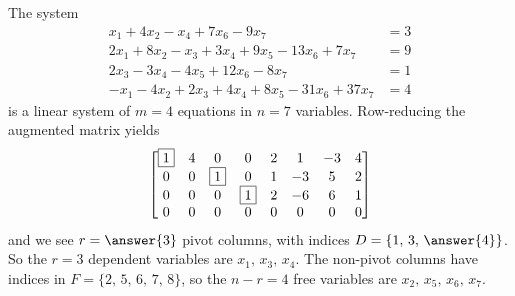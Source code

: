 \documentclass{ximera}
\begin{document}
\begin{example}
  The system
  \begin{align*}
    x_1 +4x_2  - x_4  + 7x_6 - 9x_7 &= 3\\
    2x_1 + 8x_2 - x_3 + 3x_4 + 9x_5 - 13x_6 + 7x_7 &= 9\\
    2x_3 -3x_4 -4x_5 +12x_6 -8x_7 &= 1\\
    -x_1  - 4x_2 + 2x_3 +4x_4 + 8x_5 - 31x_6 + 37x_7 &= 4
  \end{align*}
  is a linear system of $m=4$ equations in $n=7$ variables.
  Row-reducing the augmented matrix yields
  \[\begin{bmatrix}
      \fbox{1} & 4 & 0 & 0 & 2 & 1 & -3 & 4 \\
      0 & 0 & \fbox{1}  &  0 & 1 &  -3 & 5 & 2 \\
      0 & 0 &  0 & \fbox{1} & 2 &  -6 & 6 & 1 \\
      0 & 0 &  0 & 0 & 0 & 0 & 0 & 0
    \end{bmatrix}\] and we see $r=\answer{3}$ pivot columns, with
  indices $D=\{1,\,3,\,\answer{4}\}$.  So the $r=3$ dependent
  variables are $x_1,\,x_3,\,x_4$.  The non-pivot columns have indices
  in $F=\{2,\,5,\,6,\,7,\,8\}$, so the $n-r=4$ free variables are
  $x_2,\,x_5,\,x_6,\,x_7$.
  

\end{example}
\end{document}
